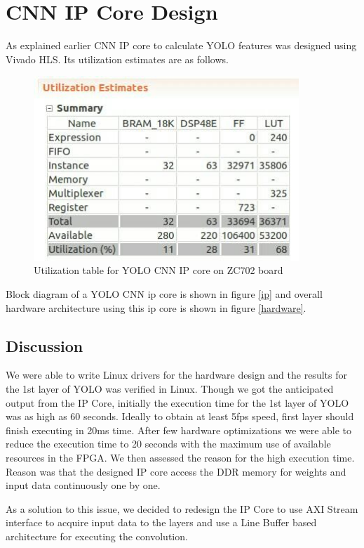 \documentclass[12pt,a4paper]{report}
\begin{document}
\section{CNN IP Core Design}
As explained earlier CNN IP core to calculate YOLO features was designed using Vivado HLS. Its utilization estimates are as follows.
\begin{figure}[H]
\includegraphics[width=10cm]{util.jpg}
\centering
\caption{Utilization table for YOLO CNN IP core on ZC702 board}
\label{util}
\end{figure}
Block diagram of a YOLO CNN ip core is shown in figure \ref{ip} and overall hardware architecture using this ip core is shown in figure \ref{hardware}.

\subsection{Discussion}
We were able to write Linux drivers for the hardware design and the results for the 1st layer of YOLO was verified in Linux. 
Though we got the anticipated output from the IP Core, initially the execution time for the 1st layer of YOLO was as high as 60 seconds. Ideally to obtain at least 5fps speed, first layer should finish executing in 20ms time. After few hardware optimizations we were able to reduce the execution time to 20 seconds with the maximum use of available resources in the FPGA.
We then assessed the reason for the high execution time. Reason was that the designed IP core access the DDR memory for weights and input data continuously one by one. 
\par As a solution to this issue, we decided to redesign the IP Core to use AXI Stream interface to acquire input data to the layers and use a Line Buffer based architecture for executing the convolution.
\end{document}
